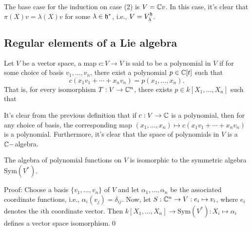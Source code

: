 \begin{dang}
    \begin{remark}
        The base case for the induction on case (2) is $V=\mathbb{C} v$. In this case, it's clear that $\pi(X)v=\lambda(X)v$ 
        for some $\lambda\in\mathfrak{h}^*$, i.e., $V=V_\lambda^{\mathfrak{h}}$.
    \end{remark}
\end{dang}


\subsection{Regular elements of a Lie algebra}
 
\begin{dang}
    \begin{definition}
        Let $V$ be a vector space, a map $c:V\to V$ is said to be a polynomial in $V$ if for some choice of basis 
        $v_1,\dots, v_n$, there exist a polynomial $p\in\mathbb{C}[t]$ such that 
        \begin{equation}
            c(x_1v_1 +\cdots+x_nv_n)=p(x_1,\dots,x_n).
        \end{equation}
        That is, for every isomorphism $T:V\to\mathbb{C}^n$, there exists $p\in k[X_1,\dots,X_n]$ such that 
            \begin{center}
            \end{center}
    \end{definition}
\end{dang}
It's clear from the previous definition that if $c:V\to \mathbb{C}$ is a polynomial, then for any choice of basis, the corresponding map 
$(x_1,\dots,x_n)\mapsto  c(x_1v_1+\cdots+x_nv_n)$ is a polynomial. Furthermore, it's clear that the space of polynomials in $V$
is a $\mathbb{C}-$algebra. 

\begin{dang}
    \begin{proposition}
        The algebra of polynomial functions on $V$ is isomorphic to the symmetric algebra $\text{Sym}(V^*)$.
    \end{proposition}
\end{dang}
Proof: Choose a basis $\{v_1,\dots,v_n\}$ of $V$ and let $\alpha_1,\dots, \alpha_n$ be the associated coordinate functions, i.e., 
$\alpha_i(v_j)=\delta_{ij}$. Now, let $S:\mathbb{C}^n\to V:e_i\mapsto v_i$, where $e_i$ denotes the $i$th coordinate vector. Then 
$k[X_1,\dots,X_n]\to \text{Sym}(V^*):X_i\mapsto \alpha_i$ defines a vector space isomorphism.\qed

